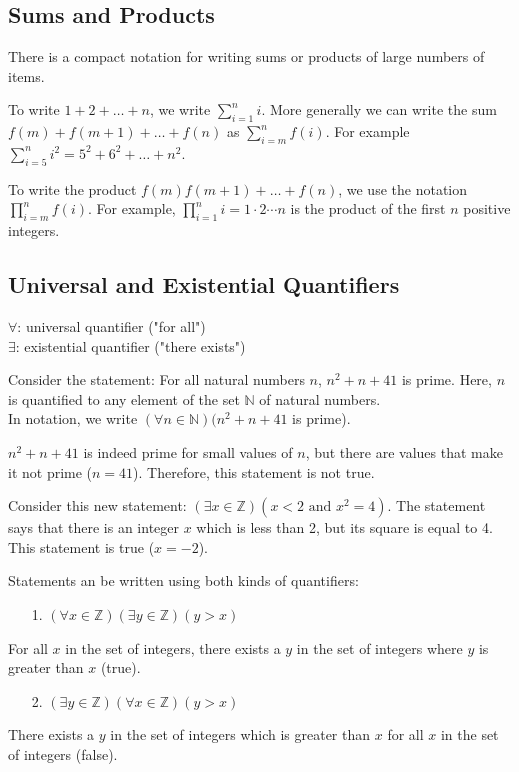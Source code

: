 \documentclass[12pt,a4paper]{article}
\begin{document}
\subsection*{Sums and Products}
There is a compact notation for writing sums or products of large numbers of items.

\bigbreak

To write $1+2+\dots+n$, we write $\sum_{i=1}^{n}i$. More generally we can write the sum $f(m)+f(m+1)+\dots+f(n)$ as $\sum_{i=m}^{n}f(i)$. For example $\sum_{i=5}^{n}i^2=5^2+6^2+\dots+n^2$.

\bigbreak

To write the product $f(m)f(m+1)+\dots+f(n)$, we use the notation $\prod_{i=m}^{n}f(i)$. For example, $\prod_{i=1}^{n}i=1\cdot 2\cdots n$ is the product of the first $n$ positive integers.

\subsection*{Universal and Existential Quantifiers}
$\forall$: universal quantifier ("for all") \\
$\exists$: existential quantifier ("there exists")

\bigbreak

Consider the statement: For all natural numbers $n$, $n^2+n+41$ is prime. Here, $n$ is quantified to any element of the set $\mathbb{N}$ of natural numbers. \\
In notation, we write $(\forall n \in \mathbb{N})(n^2+n+41$ is prime).

\bigbreak

$n^2+n+41$ is indeed prime for small values of $n$, but there are values that make it not prime ($n=41$). Therefore, this statement is not true.

\bigbreak

Consider this new statement: $(\exists x \in \mathbb{Z})(x<2 \text{ and } x^2=4)$. The statement says that there is an integer $x$ which is less than 2, but its square is equal to 4. This statement is true ($x=-2$).

\bigbreak

Statements an be written using both kinds of quantifiers:
\begin{itemize}
	\item[1.] $(\forall x \in \mathbb{Z})(\exists y \in \mathbb{Z})(y>x)$
\end{itemize}
For all $x$ in the set of integers, there exists a $y$ in the set of integers where $y$ is greater than $x$ (true).

\begin{itemize}
	\item[2.] $(\exists y \in \mathbb{Z})(\forall x \in \mathbb{Z})(y>x)$
\end{itemize}
There exists a $y$ in the set of integers which is greater than $x$ for all $x$ in the set of integers (false).
\end{document}
